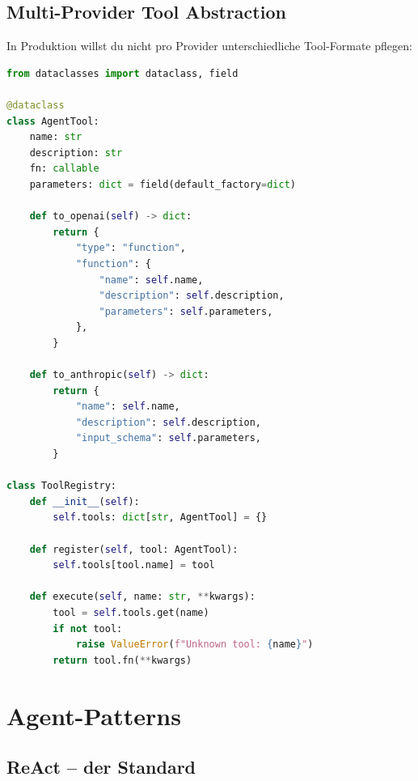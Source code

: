 \subsection{Multi-Provider Tool Abstraction}

In Produktion willst du nicht pro Provider unterschiedliche Tool-Formate pflegen:

\begin{lstlisting}[language=Python, caption=Abstraktion fuer Multi-Provider Tool Use]
from dataclasses import dataclass, field

@dataclass
class AgentTool:
    name: str
    description: str
    fn: callable
    parameters: dict = field(default_factory=dict)

    def to_openai(self) -> dict:
        return {
            "type": "function",
            "function": {
                "name": self.name,
                "description": self.description,
                "parameters": self.parameters,
            },
        }

    def to_anthropic(self) -> dict:
        return {
            "name": self.name,
            "description": self.description,
            "input_schema": self.parameters,
        }

class ToolRegistry:
    def __init__(self):
        self.tools: dict[str, AgentTool] = {}

    def register(self, tool: AgentTool):
        self.tools[tool.name] = tool

    def execute(self, name: str, **kwargs):
        tool = self.tools.get(name)
        if not tool:
            raise ValueError(f"Unknown tool: {name}")
        return tool.fn(**kwargs)
\end{lstlisting}

\section{Agent-Patterns}

\subsection{ReAct -- der Standard}

